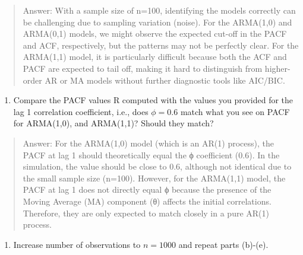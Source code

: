 \documentclass[
]{article}
\providecommand{\tightlist}{%
  \setlength{\itemsep}{0pt}\setlength{\parskip}{0pt}}
\begin{document}
\begin{quote}
Answer: With a sample size of n=100, identifying the models correctly
can be challenging due to sampling variation (noise). For the ARMA(1,0)
and ARMA(0,1) models, we might observe the expected cut-off in the PACF
and ACF, respectively, but the patterns may not be perfectly clear. For
the ARMA(1,1) model, it is particularly difficult because both the ACF
and PACF are expected to tail off, making it hard to distinguish from
higher-order AR or MA models without further diagnostic tools like
AIC/BIC.
\end{quote}

\begin{enumerate}
\def\labelenumi{(\alph{enumi})}
\setcounter{enumi}{4}
\tightlist
\item
  Compare the PACF values R computed with the values you provided for
  the lag 1 correlation coefficient, i.e., does \(\phi=0.6\) match what
  you see on PACF for ARMA(1,0), and ARMA(1,1)? Should they match?
\end{enumerate}

\begin{quote}
Answer: For the ARMA(1,0) model (which is an AR(1) process), the PACF at
lag 1 should theoretically equal the ϕ coefficient (0.6). In the
simulation, the value should be close to 0.6, although not identical due
to the small sample size (n=100). However, for the ARMA(1,1) model, the
PACF at lag 1 does not directly equal ϕ because the presence of the
Moving Average (MA) component (θ) affects the initial correlations.
Therefore, they are only expected to match closely in a pure AR(1)
process.
\end{quote}

\begin{enumerate}
\def\labelenumi{(\alph{enumi})}
\setcounter{enumi}{5}
\tightlist
\item
  Increase number of observations to \(n=1000\) and repeat parts
  (b)-(e).
\end{enumerate}
\end{document}
